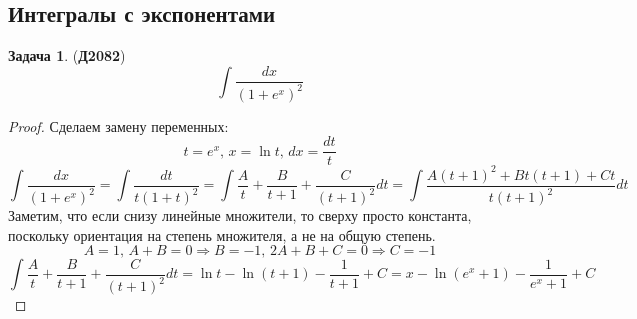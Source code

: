 \documentclass[12pt]{article}
\theoremstyle{definition}
\newtheorem{problem}{Задача}
\DeclareMathOperator{\dint}{\displaystyle\int}
\begin{document}
\subsection*{Интегралы с экспонентами}
\begin{problem}(\textbf{Д2082})
	$$
		\dint \dfrac{dx}{(1 + e^x)^2}
	$$
\end{problem}
\begin{proof}
	Сделаем замену переменных:
	$$
		t =e^x, \, x = \ln{t},\, dx = \dfrac{dt}{t}
	$$
	$$
		\dint \dfrac{dx}{(1 + e^x)^2} = \dint \dfrac{dt}{t(1 +t)^2} = \dint \dfrac{A}{t} + \dfrac{B}{t + 1} + \dfrac{C}{(t+1)^2} dt = \dint \dfrac{A(t+1)^2 + Bt(t+1) + Ct}{t(t+1)^2}dt
	$$
	Заметим, что если снизу линейные множители, то сверху просто константа, поскольку ориентация на степень множителя, а не на общую степень.
	$$
		A = 1, \, A + B = 0 \Rightarrow B = -1, \, 2A + B + C = 0 \Rightarrow C= -1
	$$
	$$
		 \dint \dfrac{A}{t} + \dfrac{B}{t + 1} + \dfrac{C}{(t+1)^2} dt = \ln{t} - \ln{(t +1)} - \dfrac{1}{t + 1} + C = x - \ln{(e^x + 1)} - \dfrac{1}{e^x + 1} +C
	$$
\end{proof}
\end{document}
